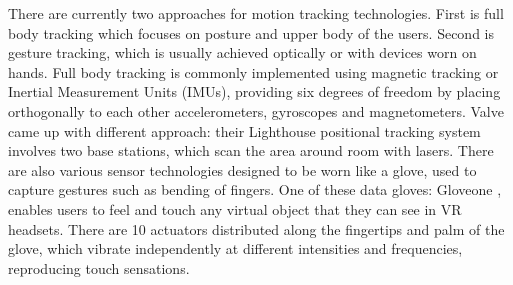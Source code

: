 There are currently two approaches for motion tracking technologies. First is full body tracking which focuses on posture and upper body of the users. Second is gesture tracking, which is usually achieved optically or with devices worn on hands. Full body tracking is commonly implemented using magnetic tracking or Inertial Measurement Units (IMUs), providing six degrees of freedom by placing orthogonally to each other accelerometers, gyroscopes and magnetometers. Valve came up with different approach: their Lighthouse positional tracking system involves two base stations, which scan the area around room with lasers. There are also various sensor technologies designed to be worn like a glove, used to capture gestures such as bending of fingers. One of these data gloves: Gloveone \cite{GLOVEONE}, enables users to feel and touch any virtual object that they can see in VR headsets. There are 10 actuators distributed along the fingertips and palm of the glove, which vibrate independently at different intensities and frequencies, reproducing touch sensations.